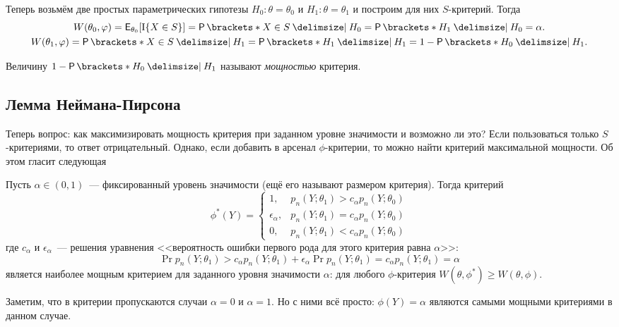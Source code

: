 Теперь возьмём две простых параметрических гипотезы \(H_{0} : \theta = 
\theta_{0}\) и \(H_{1} : \theta = \theta_{1}\) и построим для них 
\(S\)-критерий. Тогда
\begin{gather*}
	W(\theta_{0}, \phi) = \E_{\theta_{0}}[\I\{X \in S\}] = \Pr{X \in S \given 
	H_{0}} = \Pr{H_{1} \given H_{0}} = \alpha. \\
	W(\theta_{1}, \phi) = \Pr{X \in S \given H_{1}} = \Pr{H_{1} \given H_{1}} = 
	1 - \Pr{H_{0} \given H_{1}}.
\end{gather*}

Величину \(1 - \Pr{H_{0} \given H_{1}}\) называют \emph{мощностью} критерия. 

\subsection{Лемма Неймана-Пирсона}
Теперь вопрос: как максимизировать мощность критерия при заданном уровне 
значимости и возможно ли это? Если пользоваться только \(S\)-критериями, то 
ответ отрицательный. Однако, если добавить в арсенал \(\phi\)-критерии, то 
можно найти критерий максимальной мощности. Об этом гласит следующая
\begin{lemma}
	Пусть \(\alpha \in (0, 1)\)~--- фиксированный уровень значимости (ещё его 
	называют размером критерия). Тогда критерий
	\[
		\phi^{*}(Y) = \begin{cases}
		1,& p_{n}(Y; \theta_{1}) > c_{\alpha}p_{n}(Y; \theta_{0}) \\
		\epsilon_{\alpha},& p_{n}(Y; \theta_{1}) = c_{\alpha}p_{n}(Y; 
		\theta_{0}) \\
		0,& p_{n}(Y; \theta_{1}) < c_{\alpha}p_{n}(Y; \theta_{0})
		\end{cases}
	\]
	где \(c_{\alpha}\) и \(\epsilon_{\alpha}\)~--- решения уравнения 
	<<вероятность ошибки первого рода для этого критерия равна \(\alpha\)>>: 
	\[
		\Pr{p_{n}(Y; \theta_{1}) > c_{\alpha}p_{n}(Y; \theta_{1})} + 
		\epsilon_{\alpha}\Pr{p_{n}(Y; \theta_{1}) = c_{\alpha}p_{n}(Y; 
		\theta_{1})} = \alpha
	\]
	является наиболее мощным критерием для заданного уровня значимости 
	\(\alpha\): для любого \(\phi\)-критерия \(W(\theta, \phi^{*}) \geq 
	W(\theta, \phi)\).
\end{lemma}

Заметим, что в критерии пропускаются случаи \(\alpha = 0\) и \(\alpha = 1\). Но 
с ними всё просто: \(\phi(Y) = \alpha\) являются самыми мощными критериями в 
данном случае.

